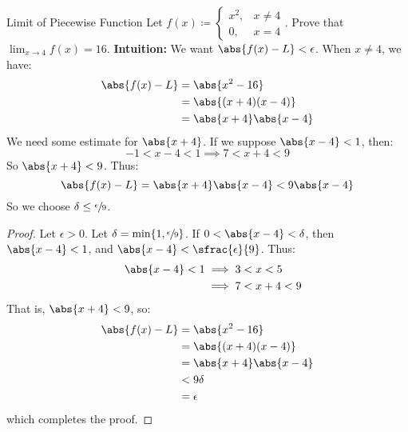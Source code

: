 \begin{exbox}{Limit of Piecewise Function}{}
    Let $f(x) \coloneq \begin{cases}
        x^2, & x \neq 4 \\
        0, & x = 4
    \end{cases}$.
    Prove that $\lim_{x \to 4} f(x) = 16$.
    \tcblower
    \textbf{Intuition:} We want $\abs{f(x) - L} < \epsilon$. When $x \neq 4$, we have:
    \begin{align*}
        \abs{f(x) - L}
        &= \abs{x^2 - 16} \\
        &= \abs{(x+4)(x-4)} \\
        &= \abs{x+4} \abs{x-4} \\
    \end{align*}
    We need some estimate for $\abs{x+4}$. If we suppose $\abs{x-4} < 1$, then:
    \[ -1 < x-4 < 1 \implies 7 < x+4 < 9 \]
    So $\abs{x+4} < 9$. Thus:
    \[ \abs{f(x) - L} = \abs{x+4}\abs{x-4} < 9 \abs{x-4} \]
    So we choose $\delta \leq \sfrac{\epsilon}{9}$.
    \begin{proof}
        Let $\epsilon > 0$. Let $\delta = \min\{ 1, \sfrac{\epsilon}{9} \}$. If $0 < \abs{x-4} < \delta$, then $\abs{x-4} < 1$, and $\abs{x-4} < \sfrac{\epsilon}{9}$. Thus:
        \begin{alignat*}{2}
            && \abs{x-4} < 1 &\implies 3 < x < 5 \\
            && &\implies 7 < x+4 < 9
        \end{alignat*}
        That is, $\abs{x+4} < 9$, so:
        \begin{align*}
            \abs{f(x) -L}
            &= \abs{x^2 - 16} \\
            &= \abs{(x+4)(x-4)} \\
            &= \abs{x+4} \abs{x-4} \\
            &< 9 \delta \\
            &= \epsilon
        \end{align*}
        which completes the proof.
    \end{proof}
\end{exbox}

